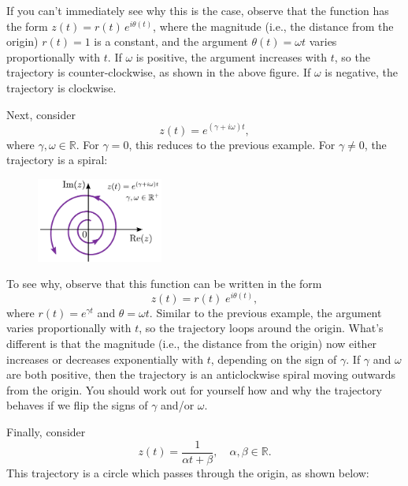 \documentclass[10pt,a4paper]{article}
\begin{document}
\noindent
If you can't immediately see why this is the case, observe that the
function has the form $z(t) = r(t)\,e^{i\theta(t)}$, where the
magnitude (i.e., the distance from the origin) $r(t) = 1$ is a
constant, and the argument $\theta(t) = \omega t$ varies
proportionally with $t$. If $\omega$ is positive, the argument
increases with $t$, so the trajectory is counter-clockwise, as shown
in the above figure. If $\omega$ is negative, the trajectory is
clockwise.

Next, consider
\begin{equation}
  z(t) = e^{(\gamma + i \omega) t},
\end{equation}
where $\gamma,\omega \in \mathbb{R}.$ For $\gamma = 0$, this reduces
to the previous example. For $\gamma \ne 0$, the trajectory is a
spiral:

\begin{figure}[h]
  \centering\includegraphics[width=0.37\textwidth]{complex_trajectory_2}
\end{figure}

\noindent
To see why, observe that this function can be written in the form
\begin{equation}
  z(t) = r(t) \;e^{i\theta(t)},
\end{equation}
where $r(t) = e^{\gamma t}$ and $\theta = \omega t.$ Similar to the
previous example, the argument varies proportionally with $t$, so the
trajectory loops around the origin. What's different is that the
magnitude (i.e., the distance from the origin) now either increases or
decreases exponentially with $t$, depending on the sign of $\gamma$.
If $\gamma$ and $\omega$ are both positive, then the trajectory is
an anticlockwise spiral moving outwards from the origin. You should work
out for yourself how and why the trajectory behaves if we flip the signs
of $\gamma$ and/or $\omega$.
    
Finally, consider
\begin{equation}
  z(t) = \frac{1}{\alpha t + \beta}, \quad \alpha,\beta \in \mathbb{R}.
\end{equation}
This trajectory is a circle which passes through the origin, as shown
below:
\end{document}
